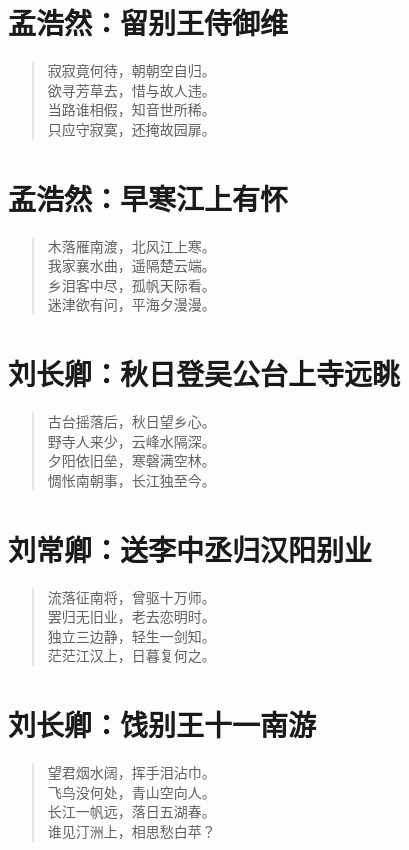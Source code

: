 \documentclass[12pt,oneside]{book}
\newenvironment{shici}{%
\begin{verse}\centering\yanti\large\hspace{12pt}}{\end{verse}}
\begin{document}
\begin{common-format}
\chapter{孟浩然：留别王侍御维}
\begin{shici}
寂寂竟何待，朝朝空自归。\\
欲寻芳草去，惜与故人违。\\
当路谁相假，知音世所稀。\\
只应守寂寞，还掩故园扉。
\end{shici}

\chapter{孟浩然：早寒江上有怀}
\begin{shici}
木落雁南渡，北风江上寒。\\
我家襄水曲，遥隔楚云端。\\
乡泪客中尽，孤帆天际看。\\
迷津欲有问，平海夕漫漫。
\end{shici}

\chapter{刘长卿：秋日登吴公台上寺远眺}
\begin{shici}
古台摇落后，秋日望乡心。\\
野寺人来少，云峰水隔深。\\
夕阳依旧垒，寒磬满空林。\\
惆怅南朝事，长江独至今。
\end{shici}

\chapter{刘常卿：送李中丞归汉阳别业}
\begin{shici}
流落征南将，曾驱十万师。\\
罢归无旧业，老去恋明时。\\
独立三边静，轻生一剑知。\\
茫茫江汉上，日暮复何之。
\end{shici}

\chapter{刘长卿：饯别王十一南游}
\begin{shici}
望君烟水阔，挥手泪沾巾。\\
飞鸟没何处，青山空向人。\\
长江一帆远，落日五湖春。\\
谁见汀洲上，相思愁白苹？
\end{shici}


\end{common-format}
\end{document}
